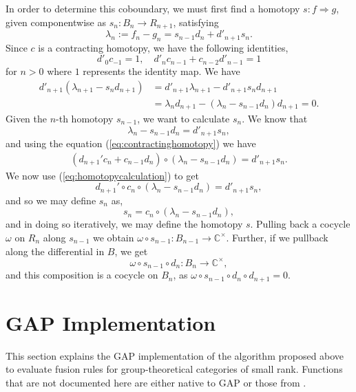 \documentclass[a4paper, 10pt]{book}
\theoremstyle{definition}
\numberwithin{equation}{chapter}
\newcommand\CC{\mathbb C}
\newcommand{\ra}\rightarrow
\begin{document}
In order to determine this coboundary, we must first find a homotopy $s: f\Rightarrow g$, given componentwise as $s_n:B_n \ra R_{n+1}$, satisfying \begin{equation}
	\lambda_{n}:= f_{n}-g_{n} = s_{n-1}d_{n} + d'_{n+1}s_{n}.
\end{equation} 
Since $c$ is a contracting homotopy, we have the following identities, \begin{equation}\label{eq:contractinghomotopy}
	d'_0c_{-1} = 1, \quad d'_n c_{n-1} + c_{n-2}d'_{n-1} = 1
\end{equation} for $n>0$ where $1$ represents the identity map.
We have \begin{align}
	d'_{n+1} (\lambda_{n+1} - s_nd_{n+1})&= d'_{n+1}\lambda_{n+1}-d'_{n+1}s_nd_{n+1} \nonumber\\
	&= \lambda_nd_{n+1} - (\lambda_n - s_{n-1}d_n)d_{n+1}=0. \label{eq:homotopycalculation}
\end{align}
Given the $n$-th homotopy $s_{n-1}$, we want to calculate $s_{n}$. We know that \begin{equation}
	\lambda_n-s_{n-1}d_n = d'_{n+1}s_n,
\end{equation} and using the equation (\ref{eq:contractinghomotopy}) we have \begin{align}
	(d_{n+1}'c_n + c_{n-1}d_n)\circ( \lambda_n-s_{n-1}d_n )= d'_{n+1}s_n.
\end{align} We now use (\ref{eq:homotopycalculation}) to get \begin{equation}
	d_{n+1}'\circ c_n \circ ( \lambda_n-s_{n-1}d_n )= d'_{n+1}s_n,
\end{equation} and so we may define $s_n$ as, \begin{equation}
	 s_n = c_n \circ ( \lambda_n-s_{n-1}d_n ),
\end{equation}
and in doing so iteratively, we may define the homotopy $s$. Pulling back a cocycle $\omega$ on $R_n$ along $s_{n-1}$ we obtain $\omega\circ s_{n-1}: B_{n-1} \ra \CC^\times$. Further, if we pullback along the differential in $B$, we get \begin{equation}
	\omega\circ s_{n-1}\circ d_n: B_n\ra \CC^\times,
\end{equation}
and this composition is a cocycle on $B_n$, as $\omega\circ s_{n-1}\circ d_n\circ d_{n+1} = 0$. 

\section{GAP Implementation}\label{gapimplementation}
This section explains the GAP implementation of the algorithm proposed above to evaluate fusion rules for group-theoretical categories of small rank. Functions that are not documented here are either native to GAP or those from \cite{2017arXiv170806538M}.
\\
\end{document}
